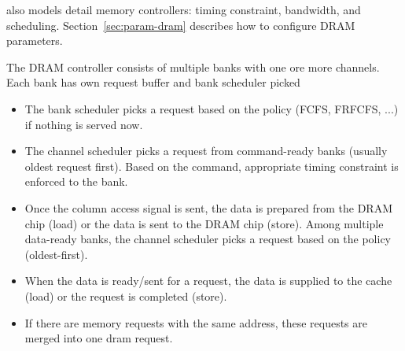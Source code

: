 \SIM also models detail memory controllers: timing constraint, 
bandwidth, and scheduling. Section~\ref{sec:param-dram} describes how
to configure DRAM parameters.

The DRAM controller consists of multiple banks with one ore more
channels. Each bank has own request buffer and bank scheduler picked

\begin{itemize}
  \item The bank scheduler picks a request based on the policy (FCFS,
  FRFCFS, ...) if nothing is served now.

  \item The channel scheduler picks a request from command-ready banks
  (usually oldest request first). Based on the command, appropriate
  timing constraint is enforced to the bank.

  \item Once the column access signal is sent, the data is prepared
  from the DRAM chip (load) or the data is sent to the DRAM chip
  (store). Among multiple data-ready banks, the channel scheduler
  picks a request based on the policy (oldest-first).

  \item When the data is ready/sent for a request, the data is
  supplied to the cache (load) or the request is completed (store).

  \item If there are memory requests with the same address, these
  requests are merged into one dram request. 

\end{itemize}



